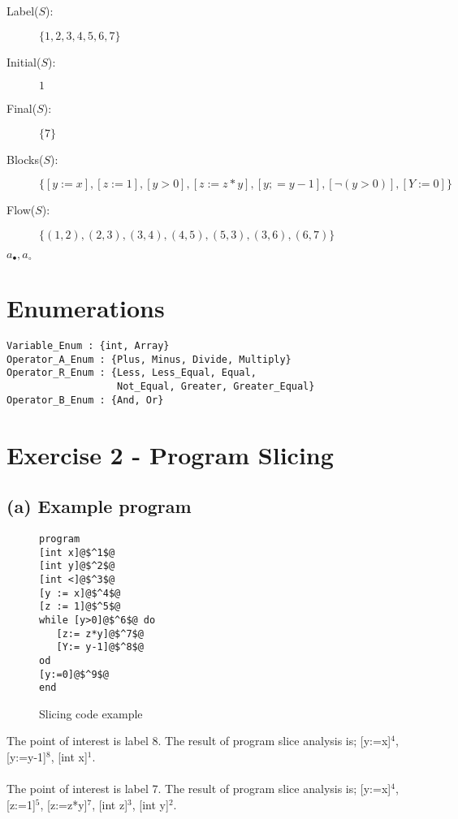 \documentclass[12pt]{article}
\begin{document}

\begin{description}
\item[Label($S$):] $\{ 1,2,3,4,5,6,7 \}$
\item[Initial($S$):] $1$
\item[Final($S$):] $\{ 7 \}$
\item[Blocks($S$):]$\{ [y:=x], [z:=1], [y>0], [z:=z*y], [y;=y-1], [\lnot (y>0)] ,[Y:=0] \}$
\item[Flow($S$):] $\{ (1,2), (2,3), (3,4), (4,5), (5,3), (3,6), (6,7) \}$
\end{description}

$a_{\bullet}, a_{\circ}$

\section*{Enumerations}
\begin{verbatim}
Variable_Enum : {int, Array}
Operator_A_Enum : {Plus, Minus, Divide, Multiply}
Operator_R_Enum : {Less, Less_Equal, Equal, 
                   Not_Equal, Greater, Greater_Equal}
Operator_B_Enum : {And, Or}
\end{verbatim}


\section*{Exercise 2 - Program Slicing}

\subsection*{(a) Example program}
\begin{figure}
\begin{lstlisting}
program
[int x]@$^1$@
[int y]@$^2$@
[int <]@$^3$@
[y := x]@$^4$@
[z := 1]@$^5$@
while [y>0]@$^6$@ do
   [z:= z*y]@$^7$@
   [Y:= y-1]@$^8$@
od
[y:=0]@$^9$@
end
\end{lstlisting}
\label{source:example2}
\caption{Slicing code example}
\end{figure}

The point of interest is label 8.  The result of program slice analysis is; [y:=x]$^4$, [y:=y-1]$^8$, [int x]$^1$.\\\\

The point of interest is label 7.  The result of program slice analysis is; [y:=x]$^4$, [z:=1]$^5$, [z:=z*y]$^7$, [int z]$^3$, [int y]$^2$.\\\\
\end{document}
